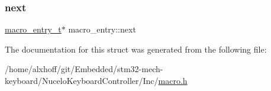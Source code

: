 \mbox{\label{structmacro__entry_a47cecf100892574702f3c1ff13ff8619}} 
\subsubsection{\texorpdfstring{next}{next}}
{\footnotesize\ttfamily \hyperlink{macro_8h_af543547a5956dde30bf18b61541fba80}{macro\+\_\+entry\+\_\+t}$\ast$ macro\+\_\+entry\+::next}



The documentation for this struct was generated from the following file\+:\begin{DoxyCompactItemize}
\item 
/home/alxhoff/git/\+Embedded/stm32-\/mech-\/keyboard/\+Nucelo\+Keyboard\+Controller/\+Inc/\hyperlink{macro_8h}{macro.\+h}\end{DoxyCompactItemize}
